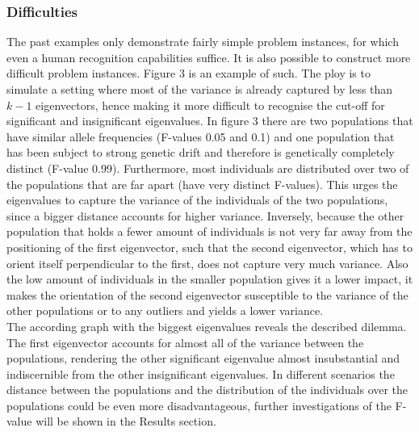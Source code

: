 \documentclass[a4paper, 11pt]{article}
\begin{document}
\subsubsection{Difficulties}
The past examples only demonstrate fairly simple problem instances, for which even a human recognition capabilities suffice. It is also possible to construct more difficult problem instances. Figure 3 is an example of such. The ploy is to simulate a setting where most of the variance is already captured by less than $k-1$ eigenvectors, hence making it more difficult to recognise the cut-off for significant and insignificant eigenvalues. In figure 3 there are two populations that have similar allele frequencies (F-values 0.05 and 0.1) and one population that has been subject to strong genetic drift and therefore is genetically completely distinct (F-value 0.99). Furthermore, most individuals are distributed over two of the populations that are far apart (have very distinct F-values). This urges the eigenvalues to capture the variance of the individuals of the two populations, since a bigger distance accounts for higher variance. Inversely, because the other population that holds a fewer amount of individuals is not very far away from the positioning of the first eigenvector, such that the second eigenvector, which has to orient itself perpendicular to the first, does not capture very much variance. Also the low amount of individuals in the smaller population gives it a lower impact, it makes the orientation of the second eigenvector susceptible to the variance of the other populations or to any outliers and yields a lower variance. \\

The according graph with the biggest eigenvalues reveals the described dilemma. The first eigenvector accounts for almost all of the variance between the populations, rendering the other significant eigenvalue almost insubstantial and indiscernible from the other insignificant eigenvalues. In different scenarios the distance between the populations and the distribution of the individuals over the populations could be even more disadvantageous, further investigations of the F-value will be shown in the Results section.
\end{document}
